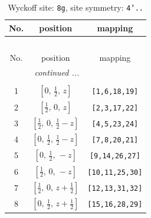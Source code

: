 \documentclass[fleqn,8pt]{jsarticle}
\begin{document}
\begin{longtable}{ccc}
\caption{Wyckoff site: {\tt 8g}, site symmetry: {\tt 4'..}}
 \\
 \hline \hline
No. & position & mapping \\ \hline \endfirsthead

\multicolumn{2}{l}{\tablename\ \thetable{}} \\
 \hline \hline
No. & position & mapping \\ \hline \endhead

 \hline \hline
\multicolumn{2}{r}{\footnotesize\it continued ...} \\ \endfoot

 \hline \hline
\multicolumn{2}{r}{} \\ \endlastfoot

1 & $\left[ 0,\, \frac{1}{2},\, z \right]$ & {\tt [1,6,18,19]} \\ \hline
2 & $\left[ \frac{1}{2},\, 0,\, z \right]$ & {\tt [2,3,17,22]} \\ \hline
3 & $\left[ \frac{1}{2},\, 0,\, \frac{1}{2} - z \right]$ & {\tt [4,5,23,24]} \\ \hline
4 & $\left[ 0,\, \frac{1}{2},\, \frac{1}{2} - z \right]$ & {\tt [7,8,20,21]} \\ \hline
5 & $\left[ 0,\, \frac{1}{2},\, - z \right]$ & {\tt [9,14,26,27]} \\ \hline
6 & $\left[ \frac{1}{2},\, 0,\, - z \right]$ & {\tt [10,11,25,30]} \\ \hline
7 & $\left[ \frac{1}{2},\, 0,\, z + \frac{1}{2} \right]$ & {\tt [12,13,31,32]} \\ \hline
8 & $\left[ 0,\, \frac{1}{2},\, z + \frac{1}{2} \right]$ & {\tt [15,16,28,29]} \\
\end{longtable}
\renewcommand{\arraystretch}{1.2}
\end{document}
